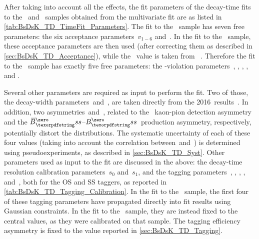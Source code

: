 After taking into account all the effects, the fit parameters of the decay-time fits to the \BsDsPi~and \BsDsK~samples obtained from the multivariate fit are as listed in \cref{tab:BsDsK_TD_TimeFit_Parameters}.
The fit to the \BsDsPi~sample has seven free parameters: the six acceptance parameters~\(v_{1-6}\) and~\dms.
In the fit to the \BsDsK~sample, these acceptance parameters are then used (after correcting them as described in \cref{sec:BsDsK_TD_Acceptance}), while the \dms~value is taken from \hflav~\cite{HFLAV2016}.
Therefore the fit to the \BsDsK~sample has exactly five free parameters: the \CP-violation parameters~\Cpar, \Spar, \Sbpar, \Dpar, and \Dbpar.

Several other parameters are required as input to perform the fit.
Two of those, the decay-width parameters~\Gs and~\DGs, are taken directly from the 2016~\hflav results~\cite{HFLAV2016}.
In addition, two asymmetries~\AdetKPi and~\AprodBs, related to the \lhcb~kaon-pion detection asymmetry and the \(\Bsb\)--\(\Bs\)~production asymmetry, respectively, potentially distort the distributions.
The systematic uncertainty of each of these four values (taking into account the correlation between~\Gs and~\DGs) is determined using pseudoexperiments, as described in \cref{sec:BsDsK_TD_Syst}.
Other parameters used as input to the fit are discussed in the  above: the decay-time resolution calibration parameters~\(s_{0}\) and~\(s_{1}\), and the tagging parameters~, , , , and~\Detag, both for the OS and SS taggers, as reported in \cref{tab:BsDsK_TD_Tagging_Calibration}.
In the fit to the \BsDsK~sample, the first four of these tagging parameters have propagated directly into fit results using Gaussian constraints.
In the fit to the \BsDsPi~sample, they are instead fixed to the central values, as they were calibrated on that sample.
The tagging efficiency asymmetry is fixed to the value reported in \cref{sec:BsDsK_TD_Tagging}.

